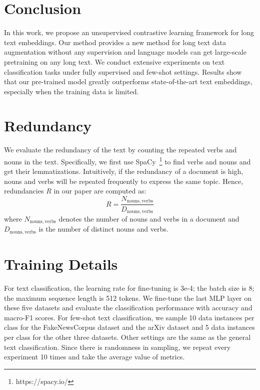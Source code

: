 \documentclass[11pt]{article}
\begin{document}
\section{Conclusion}
\label{sec:conclusion}
In this work, we propose an unsupervised contrastive learning framework for long text embeddings. 
Our method provides a new method for long text data augmentation without any supervision and language models can get large-scale pretraining on any long text. 
We conduct extensive experiments on text classification tasks under fully supervised and few-shot settings.
Results show that our pre-trained model greatly outperforms state-of-the-art text embeddings, especially when the training data is limited.




\clearpage
\appendix
\section{Redundancy}
\label{app:redundacy}
\begin{table}[h]
    
    \caption{Information redundancies for different lengths (i.e.,~word numbers) of text: (1) 0-50 (2) 51-100 (3) 101-200 (4) 201-300 (5) more than 300.}
    \label{redundancy}
\end{table}

We evaluate the redundancy of the text by counting the repeated verbs and nouns in the text. Specifically, we first use SpaCy~\footnote{https://spacy.io/} to find verbs and nouns and get their lemmatizations. Intuitively, if the redundancy of a document is high, nouns and verbs will be repeated frequently to express the same topic. Hence, redundancies $R$ in our paper are computed as:
\begin{equation}
    R = \frac{N_{\mathrm{nouns, verbs}}}{D_{\mathrm{nouns, verbs}}}
\end{equation}
where $N_{\mathrm{nouns, verbs}}$ denotes the number of nouns and verbs in a document and $D_{\mathrm{nouns, verbs}}$ is the number of distinct nouns and verbs.


\section{Training Details}
\label{app:details}
For text classification, the learning rate for fine-tuning is 3e-4; the batch size is 8; the maximum sequence length is 512 tokens. 
We fine-tune the last MLP layer on these five datasets and evaluate the classification performance with accuracy and macro-F1 scores.
For few-shot text classification, we sample 10 data instances per class for the FakeNewsCorpus dataset and the arXiv dataset and 5 data instances per class for the other three datasets. 
Other settings are the same as the general text classification. 
Since there is randomness in sampling, we repeat every experiment 10 times and take the average value of metrics.
\end{document}
